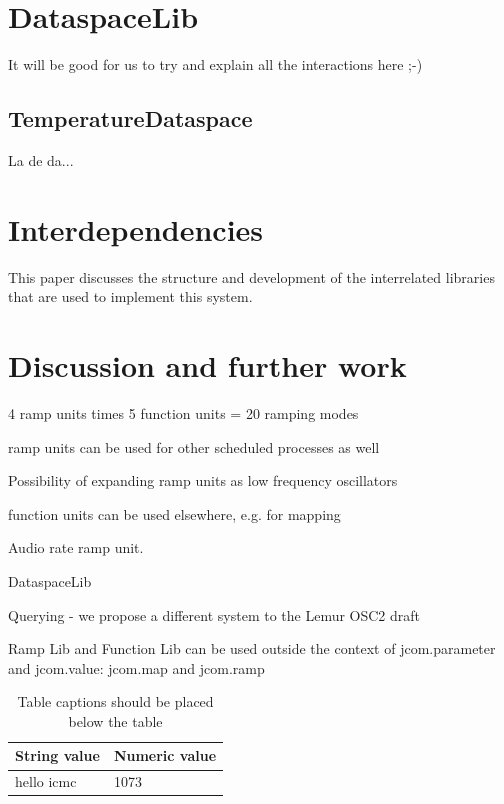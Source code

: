 \documentclass{article}
\begin{document}
\section{DataspaceLib}\label{sec:dataspacelib}

It will be good for us to try and explain all the interactions here ;-)

\subsection{TemperatureDataspace}\label{subsec:temperature_dataspace}

La de da...



\section{Interdependencies}\label{sec:interdependencies}

This paper discusses the structure and development of the interrelated libraries that are used to implement this system.




\section{Discussion and further work} %
\label{sec:discussion_and_further_work}

4 ramp units times 5 function units = 20 ramping modes

ramp units can be used for other scheduled processes as well

Possibility of expanding ramp units as low frequency oscillators

function units can be used elsewhere, e.g. for mapping

Audio rate ramp unit.

DataspaceLib

Querying - we propose a different system to the Lemur OSC2 draft

Ramp Lib and Function Lib can be used outside the context of jcom.parameter and jcom.value: jcom.map and jcom.ramp





\begin{table}
\begin{center}
\begin{tabular}{|l|l|}
\hline
String value & Numeric value \\
\hline
hello icmc  & 1073 \\
\hline
\end{tabular}
\end{center}
\caption{Table captions should be placed below the table}
\label{tab:example}
\end{table}
\end{document}

